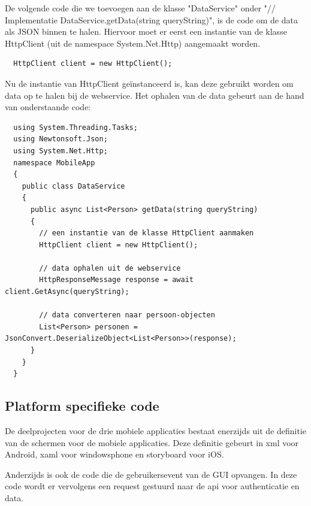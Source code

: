 De volgende code die we toevoegen aan de klasse "DataService" onder "// Implementatie DataService.getData(string queryString)", is de code om de data als JSON binnen te halen.
Hiervoor moet er eerst een instantie van de klasse HttpClient (uit de namespace System.Net.Http) aangemaakt worden.
\begin{lstlisting}
  HttpClient client = new HttpClient();
\end{lstlisting}
\newpage
Nu de instantie van HttpClient geïnstanceerd is, kan deze gebruikt worden om data op te halen bij de webservice.
Het ophalen van de data gebeurt aan de hand van onderstaande code:
\begin{lstlisting}
  using System.Threading.Tasks;
  using Newtonsoft.Json;
  using System.Net.Http;
  namespace MobileApp
  {
    public class DataService
    {
      public async List<Person> getData(string queryString)
      {
        // een instantie van de klasse HttpClient aanmaken
        HttpClient client = new HttpClient();

        // data ophalen uit de webservice
        HttpResponseMessage response = await client.GetAsync(queryString);

        // data converteren naar persoon-objecten
        List<Person> personen = JsonConvert.DeserializeObject<List<Person>>(response);
      }
    }
  }
\end{lstlisting}



\subsection{Platform specifieke code}
De deelprojecten voor de drie mobiele applicaties bestaat enerzijds uit de definitie van de schermen voor de mobiele applicaties.
Deze definitie gebeurt in xml voor Android, xaml voor windowsphone en storyboard voor iOS.

Anderzijds is ook de code die de gebruikersevent van de GUI opvangen. In deze code wordt er vervolgens een request gestuurd naar
de api voor authenticatie en data.
